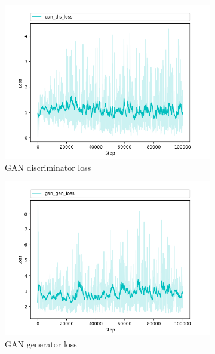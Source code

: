 \begin{figure}
  \begin{subfigure}[b]{0.5\textwidth}
    \includegraphics[width=\textwidth]{figures/gan_dis_loss}
    \caption{GAN discriminator loss}
    \label{fig:gan_dis_loss}
  \end{subfigure}
  \hfill
  \begin{subfigure}[b]{0.5\textwidth}
    \includegraphics[width=\textwidth]{figures/gan_gen_loss}
    \caption{GAN generator loss}
    \label{fig:gan_gen_loss}
  \end{subfigure}
  \begin{subfigure}[b]{0.5\textwidth}

\end{subfigure}
\end{figure}
